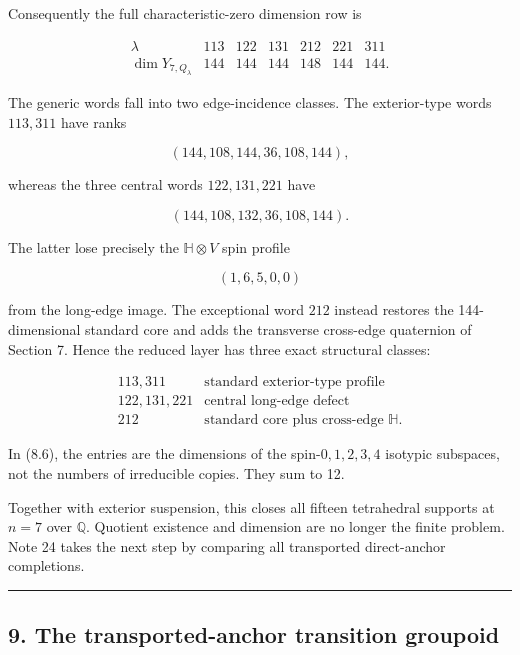 \documentclass[
  11pt,
  a4paper,
]{article}
\begin{document}
Consequently the full characteristic-zero dimension row is

\[
\boxed{
\begin{array}{c|rrrrrr}
\lambda&113&122&131&212&221&311\\ \hline
\dim Y_{7,Q_\lambda}&144&144&144&148&144&144.
\end{array}}
\tag{8.3}
\]

The generic words fall into two edge-incidence classes. The
exterior-type words \(113,311\) have ranks

\[
(144,108,144,36,108,144),
\tag{8.4}
\]

whereas the three central words \(122,131,221\) have

\[
(144,108,132,36,108,144).
\tag{8.5}
\]

The latter lose precisely the \(\mathbb H\otimes V\) spin profile

\[
(1,6,5,0,0)
\tag{8.6}
\]

from the long-edge image. The exceptional word \(212\) instead restores
the 144-dimensional standard core and adds the transverse cross-edge
quaternion of Section 7. Hence the reduced layer has three exact
structural classes:

\[
\boxed{
\begin{array}{c|c}
113,311&\text{standard exterior-type profile}\\
122,131,221&\text{central long-edge defect}\\
212&\text{standard core plus cross-edge }\mathbb H.
\end{array}}
\tag{8.7}
\]

In (8.6), the entries are the dimensions of the spin-\(0,1,2,3,4\)
isotypic subspaces, not the numbers of irreducible copies. They sum to
12.

Together with exterior suspension, this closes all fifteen tetrahedral
supports at \(n=7\) over \(\mathbb Q\). Quotient existence and dimension
are no longer the finite problem. Note 24 takes the next step by
comparing all transported direct-anchor completions.

\begin{center}\rule{0.5\linewidth}{0.5pt}\end{center}

\hypertarget{the-transported-anchor-transition-groupoid}{%
\subsection{9. The transported-anchor transition
groupoid}\label{the-transported-anchor-transition-groupoid}}
\end{document}
